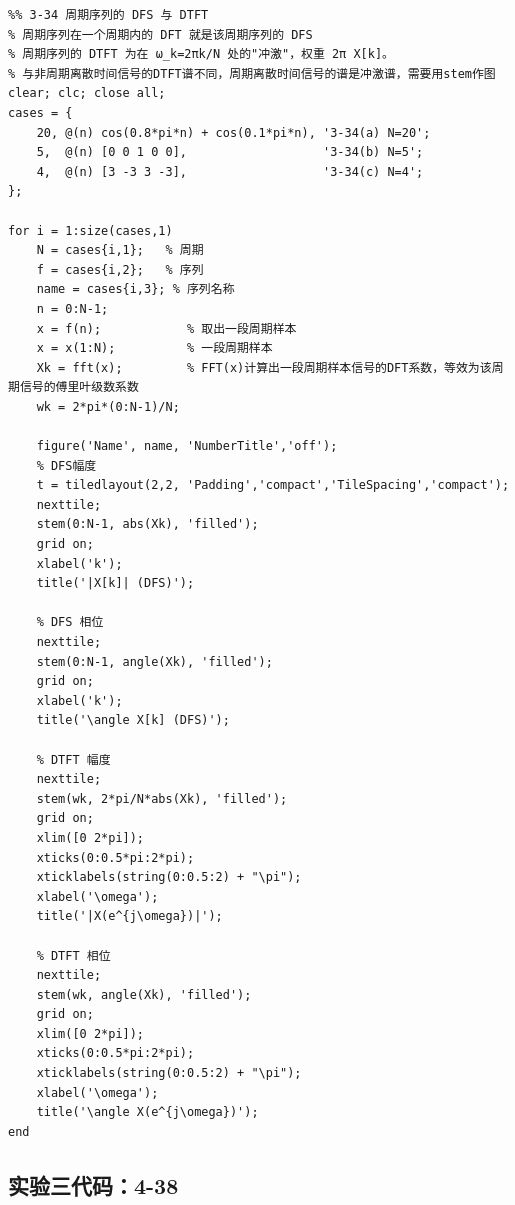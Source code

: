 \documentclass[UTF8,12pt,a4paper]{ctexart}
\begin{document}
\begin{lstlisting}
%% 3-34 周期序列的 DFS 与 DTFT
% 周期序列在一个周期内的 DFT 就是该周期序列的 DFS
% 周期序列的 DTFT 为在 ω_k=2πk/N 处的"冲激"，权重 2π X[k]。
% 与非周期离散时间信号的DTFT谱不同，周期离散时间信号的谱是冲激谱，需要用stem作图
clear; clc; close all;
cases = {
    20, @(n) cos(0.8*pi*n) + cos(0.1*pi*n), '3-34(a) N=20';
    5,  @(n) [0 0 1 0 0],                   '3-34(b) N=5';
    4,  @(n) [3 -3 3 -3],                   '3-34(c) N=4';
};

for i = 1:size(cases,1)
    N = cases{i,1};   % 周期
    f = cases{i,2};   % 序列
    name = cases{i,3}; % 序列名称
    n = 0:N-1; 
    x = f(n);            % 取出一段周期样本
    x = x(1:N);          % 一段周期样本
    Xk = fft(x);         % FFT(x)计算出一段周期样本信号的DFT系数，等效为该周期信号的傅里叶级数系数
    wk = 2*pi*(0:N-1)/N;

    figure('Name', name, 'NumberTitle','off');
    % DFS幅度
    t = tiledlayout(2,2, 'Padding','compact','TileSpacing','compact');
    nexttile; 
    stem(0:N-1, abs(Xk), 'filled'); 
    grid on;
    xlabel('k'); 
    title('|X[k]| (DFS)');

    % DFS 相位
    nexttile; 
    stem(0:N-1, angle(Xk), 'filled'); 
    grid on;
    xlabel('k'); 
    title('\angle X[k] (DFS)');

    % DTFT 幅度
    nexttile; 
    stem(wk, 2*pi/N*abs(Xk), 'filled'); 
    grid on; 
    xlim([0 2*pi]);
    xticks(0:0.5*pi:2*pi);
    xticklabels(string(0:0.5:2) + "\pi");
    xlabel('\omega'); 
    title('|X(e^{j\omega})|');

    % DTFT 相位
    nexttile; 
    stem(wk, angle(Xk), 'filled'); 
    grid on; 
    xlim([0 2*pi]);
    xticks(0:0.5*pi:2*pi);
    xticklabels(string(0:0.5:2) + "\pi");
    xlabel('\omega'); 
    title('\angle X(e^{j\omega})');
end
\end{lstlisting}

\subsection{实验三代码：4-38}
\end{document}
